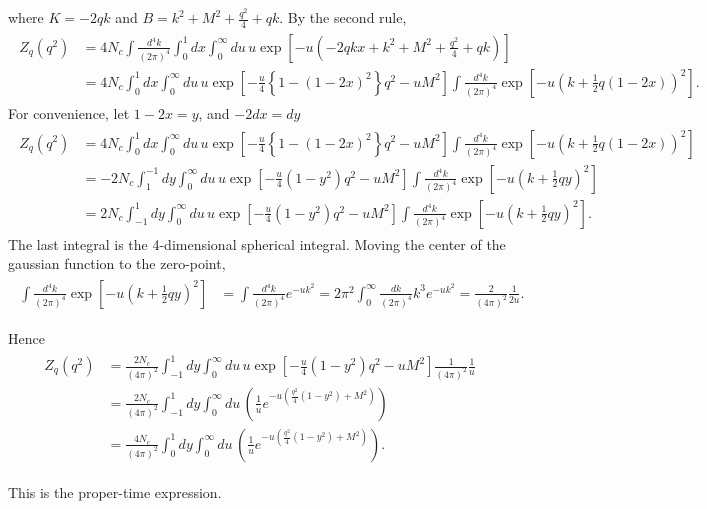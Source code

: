 \documentclass[tightenlines,floatfix,nofootinbib,superscriptaddress,fleqn]{revtex4-2}
\begin{document}
where $K = -2qk$ and $B = k^2+M^2+\frac{q^2}{4}+qk$. By the second rule,
\begin{align}
  \begin{split}
    Z_q(q^2)
    &= 4N_c\int\frac{d^4k}{(2\pi)^4}
    \int^1_0dx
    \int^\infty_0du\,u\exp\left[-u\left(-2qkx
    +k^2+M^2+\frac{q^2}{4}+qk\right)\right]  \\
    &= 4N_c
    \int^1_0dx
    \int^\infty_0du\,u
    \exp\left[-\frac{u}{4}\left\{
      1-(1-2x)^2
    \right\}q^2-uM^2\right]
    \int\frac{d^4k}{(2\pi)^4}
    \exp\left[-u\left(k+\frac{1}{2}q(1-2x)\right)^2\right].
  \end{split}
\end{align}
For convenience, let $1-2x=y$,  and $-2dx=dy$
\begin{align}
  \begin{split}
    Z_q(q^2)
    &= 4N_c
    \int^1_0dx
    \int^\infty_0du\,u
    \exp\left[-\frac{u}{4}\left\{
      1-(1-2x)^2
    \right\}q^2-uM^2\right]
    \int\frac{d^4k}{(2\pi)^4}
    \exp\left[-u\left(k+\frac{1}{2}q(1-2x)\right)^2\right]  \\
    &=-2N_c
    \int^{-1}_1dy
    \int^\infty_0du\,u
    \exp\left[-\frac{u}{4}\left(
      1-y^2
      \right)q^2-uM^2\right]
      \int\frac{d^4k}{(2\pi)^4}
      \exp\left[-u\left(k+\frac{1}{2}qy\right)^2\right] \\
    &= 2N_c
    \int_{-1}^1dy
    \int^\infty_0du\,u
    \exp\left[-\frac{u}{4}\left(
      1-y^2
      \right)q^2-uM^2\right]
      \int\frac{d^4k}{(2\pi)^4}
      \exp\left[-u\left(k+\frac{1}{2}qy\right)^2\right].
  \end{split}
\end{align}
The last integral is the 4-dimensional spherical integral. 
Moving the center of the gaussian function to the zero-point,
\begin{align}
  \begin{split}
    \int\frac{d^4k}{(2\pi)^4}
      \exp\left[-u\left(k+\frac{1}{2}qy\right)^2\right]
      &=\int\frac{d^4k}{(2\pi)^4}
      e^{-uk^2} 
      = 2\pi^2\int^\infty_0\frac{dk}{(2\pi)^4}
      k^3e^{-uk^2}
      = \frac{2}{(4\pi)^2}\frac{1}{2u}.
      \end{split}
\end{align}

Hence
\begin{align}
  \begin{split}
    Z_q(q^2)&=\frac{2N_c}{(4\pi)^2}
    \int_{-1}^1dy
    \int^\infty_0du\,u
    \exp\left[-\frac{u}{4}\left(
      1-y^2
      \right)q^2-uM^2\right]
      \frac{1}{(4\pi)^2}\frac{1}{u}  \\
      &=\frac{2N_c}{(4\pi)^2}
      \int_{-1}^1dy
      \int^\infty_0du\,
        \left(\frac{1}{u}e^{-u\left(\frac{q^2}{4}\left(
          1-y^2
          \right)+M^2\right)}\right)  \\
          &=\frac{4N_c}{(4\pi)^2}
          \int_{0}^1dy
          \int^\infty_0du\,
            \left(\frac{1}{u}e^{-u\left(\frac{q^2}{4}\left(
              1-y^2
              \right)+M^2\right)}\right).
  \end{split}
\end{align}

This is the proper-time expression.
\end{document}
